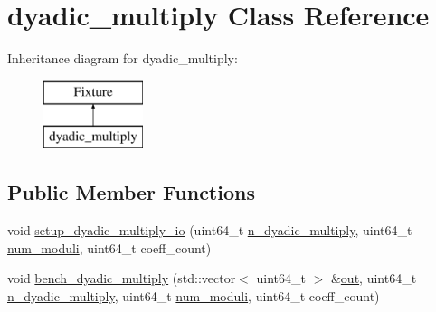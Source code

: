 \hypertarget{classdyadic__multiply}{\section{dyadic\-\_\-multiply Class Reference}
\label{classdyadic__multiply}
}
Inheritance diagram for dyadic\-\_\-multiply\-:\begin{figure}[H]
\begin{center}
\leavevmode
\includegraphics[height=2.000000cm]{classdyadic__multiply}
\end{center}
\end{figure}
\subsection*{Public Member Functions}
\begin{DoxyCompactItemize}
\item 
void \hyperlink{classdyadic__multiply_ae7e70c56054e97f2e7422865401a1d18}{setup\-\_\-dyadic\-\_\-multiply\-\_\-io} (uint64\-\_\-t \hyperlink{bench__dyadic__multiply_8cpp_a1249f7c009d650067cdc1e2254fcb63c}{n\-\_\-dyadic\-\_\-multiply}, uint64\-\_\-t \hyperlink{bench__dyadic__multiply_8cpp_a94cbf59cad79634589387a30784ed78d}{num\-\_\-moduli}, uint64\-\_\-t coeff\-\_\-count)
\item 
void \hyperlink{classdyadic__multiply_a7104e784aa094e223ab692ab3cd1a663}{bench\-\_\-dyadic\-\_\-multiply} (std\-::vector$<$ uint64\-\_\-t $>$ \&\hyperlink{bench__dyadic__multiply_8cpp_a9df79bfc3d20b59bcaf8d6721d1b8b82}{out}, uint64\-\_\-t \hyperlink{bench__dyadic__multiply_8cpp_a1249f7c009d650067cdc1e2254fcb63c}{n\-\_\-dyadic\-\_\-multiply}, uint64\-\_\-t \hyperlink{bench__dyadic__multiply_8cpp_a94cbf59cad79634589387a30784ed78d}{num\-\_\-moduli}, uint64\-\_\-t coeff\-\_\-count)
\end{DoxyCompactItemize}


